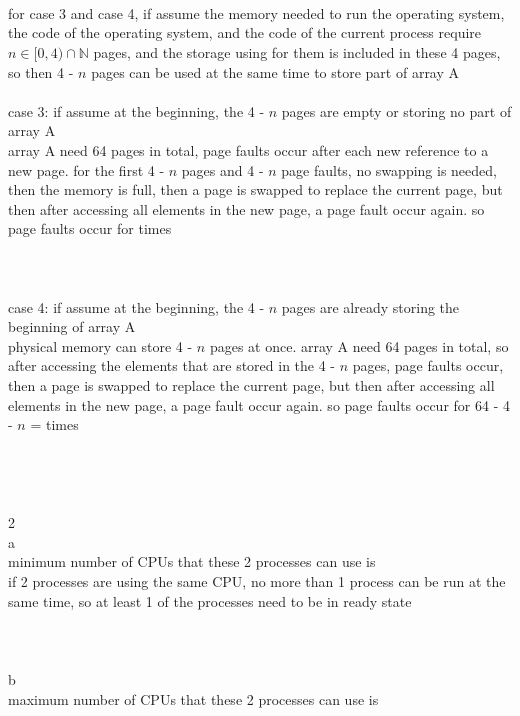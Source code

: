 \documentclass[12pt, border = 4pt, multi]{article} %
\begin{document}
\\
\\
\\
for case 3 and case 4, if assume the memory needed to run the operating system, the code of the operating system, and the code of the current process require $n \in [0, 4) \cap \mathbb{N}$ pages, and the storage using for them is included in these 4 pages, so then 4 - $n$ pages can be used at the same time to store part of array A\\
\\
case 3: if assume at the beginning, the 4 - $n$ pages are empty or storing no part of array A\\
array A need 64 pages in total, page faults occur after each new reference to a new page. for the first 4 - $n$ pages and 4 - $n$ page faults, no swapping is needed, then the memory is full, then a page is swapped to replace the current page, but then after accessing all elements in the new page, a page fault occur again. so page faults occur for  times\\ 
\\
\\
\\
case 4: if assume at the beginning, the 4 - $n$ pages are already storing the beginning of array A\\
physical memory can store 4 - $n$ pages at once. array A need 64 pages in total, so after accessing the elements that are stored in the 4 - $n$ pages, page faults occur, then a page is swapped to replace the current page, but then after accessing all elements in the new page, a page fault occur again. so page faults occur for 64 - 4 - $n$ =  times\\
\\
\\
\\
\\
2\\
a\\
minimum number of CPUs that these 2 processes can use is \\
if 2 processes are using the same CPU, no more than 1 process can be run at the same time, so at least 1 of the processes need to be in ready state\\
\\
\\
\\
b\\
maximum number of CPUs that these 2 processes can use is \\
\end{document}
